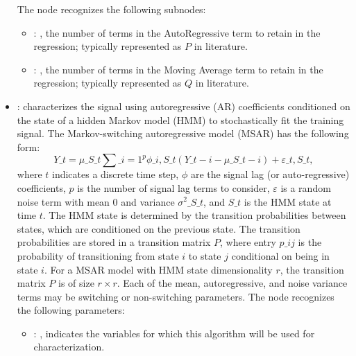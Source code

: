 \begin{itemize}
      The  node recognizes the following subnodes:
      \begin{itemize}
        \item {}: , 
          the number of terms in the AutoRegressive term to retain in the
          regression; typically represented as $P$ in literature.

        \item {}: , 
          the number of terms in the Moving Average term to retain in the
          regression; typically represented as $Q$ in literature.
      \end{itemize}

    \item {}:
      characterizes the signal using autoregressive (AR) coefficients conditioned         on the
      state of a hidden Markov model (HMM) to stochastically fit the training signal.         The
      Markov-switching autoregressive model (MSAR) has the following form:         \begin{equation*}
      Y\_t = \mu\_{S\_t} \sum\_{i=1}^p \phi\_{i,{S\_t}} \left(Y\_{t-i} - \mu\_{S\_{t-i}}\right) +
      \varepsilon\_{t,{S\_t}},         \end{equation*}         where $t$ indicates a discrete time
      step, $\phi$ are the signal lag (or auto-regressive)         coefficients, $p$ is the number
      of signal lag terms to consider, $\varepsilon$ is a random noise         term with mean 0 and
      variance $\sigma^2\_{S\_t}$, and $S\_t$ is the HMM state at time $t$.         The HMM state is
      determined by the transition probabilities between states, which are conditioned         on
      the previous state. The transition probabilities are stored in a transition matrix $P$,
      where entry $p\_{ij}$ is the probability of transitioning from state $i$ to state $j$
      conditional         on being in state $i$. For a MSAR model with HMM state dimensionality $r$,
      the transition matrix         $P$ is of size $r \times r$. Each of the mean, autoregressive,
      and noise variance terms may be         switching or non-switching parameters.
      The  node recognizes the following parameters:
        \begin{itemize}
          \item {}: , 
            indicates the variables for which this algorithm will be used for characterization.

\end{itemize}
\end{itemize}
